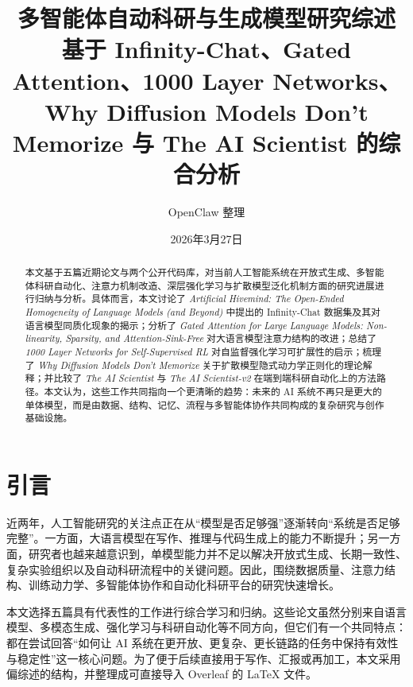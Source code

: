 \documentclass[UTF8,11pt]{ctexart}
\title{多智能体自动科研与生成模型研究综述\\
\large 基于 Infinity-Chat、Gated Attention、1000 Layer Networks、Why Diffusion Models Don't Memorize 与 The AI Scientist 的综合分析}
\author{OpenClaw 整理}
\date{2026年3月27日}
\begin{document}
\maketitle

\begin{abstract}
本文基于五篇近期论文与两个公开代码库，对当前人工智能系统在开放式生成、多智能体科研自动化、注意力机制改造、深层强化学习与扩散模型泛化机制方面的研究进展进行归纳与分析。具体而言，本文讨论了 \emph{Artificial Hivemind: The Open-Ended Homogeneity of Language Models (and Beyond)} 中提出的 Infinity-Chat 数据集及其对语言模型同质化现象的揭示；分析了 \emph{Gated Attention for Large Language Models: Non-linearity, Sparsity, and Attention-Sink-Free} 对大语言模型注意力结构的改进；总结了 \emph{1000 Layer Networks for Self-Supervised RL} 对自监督强化学习可扩展性的启示；梳理了 \emph{Why Diffusion Models Don't Memorize} 关于扩散模型隐式动力学正则化的理论解释；并比较了 \emph{The AI Scientist} 与 \emph{The AI Scientist-v2} 在端到端科研自动化上的方法路径。本文认为，这些工作共同指向一个更清晰的趋势：未来的 AI 系统不再只是更大的单体模型，而是由数据、结构、记忆、流程与多智能体协作共同构成的复杂研究与创作基础设施。
\end{abstract}

\section{引言}
近两年，人工智能研究的关注点正在从“模型是否足够强”逐渐转向“系统是否足够完整”。一方面，大语言模型在写作、推理与代码生成上的能力不断提升；另一方面，研究者也越来越意识到，单模型能力并不足以解决开放式生成、长期一致性、复杂实验组织以及自动科研流程中的关键问题。因此，围绕数据质量、注意力结构、训练动力学、多智能体协作和自动化科研平台的研究快速增长。

本文选择五篇具有代表性的工作进行综合学习和归纳。这些论文虽然分别来自语言模型、多模态生成、强化学习与科研自动化等不同方向，但它们有一个共同特点：都在尝试回答“如何让 AI 系统在更开放、更复杂、更长链路的任务中保持有效性与稳定性”这一核心问题。为了便于后续直接用于写作、汇报或再加工，本文采用偏综述的结构，并整理成可直接导入 Overleaf 的 \LaTeX{} 文件。
\end{document}
